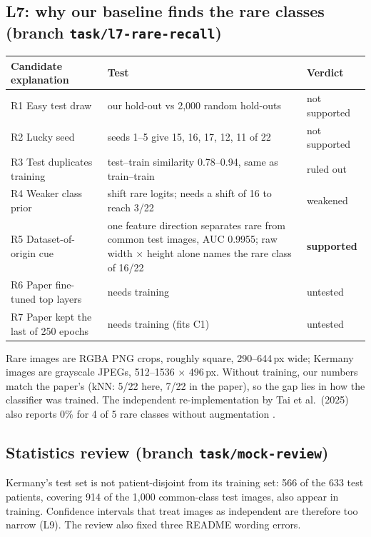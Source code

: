 \documentclass[10pt,a4paper]{article}
\begin{document}
\subsection{L7: why our baseline finds the rare classes (branch \texttt{task/l7-rare-recall})}

\noindent
\begin{tabularx}{\linewidth}{@{}l Y l@{}}
\toprule
Candidate explanation & Test & Verdict \\
\midrule
R1 Easy test draw & our hold-out vs 2,000 random hold-outs & not supported \\
R2 Lucky seed & seeds 1--5 give 15, 16, 17, 12, 11 of 22 & not supported \\
R3 Test duplicates training & test--train similarity 0.78--0.94, same as train--train & ruled out \\
R4 Weaker class prior & shift rare logits; needs a shift of 16 to reach 3/22 & weakened \\
R5 Dataset-of-origin cue & one feature direction separates rare from common test images,
   AUC 0.9955; raw width $\times$ height alone names the rare class of 16/22 & \textcolor{warn}{\textbf{supported}} \\
R6 Paper fine-tuned top layers & needs training & untested \\
R7 Paper kept the last of 250 epochs & needs training (fits C1) & untested \\
\bottomrule
\end{tabularx}

\medskip
\noindent
Rare images are RGBA PNG crops, roughly square, 290--644\,px wide; Kermany images are
grayscale JPEGs, 512--1536 $\times$ 496\,px. Without training, our numbers match the paper's
(kNN: 5/22 here, 7/22 in the paper), so the gap lies in how the classifier was trained.
The independent re-implementation by Tai et al.\ (2025) also reports 0\% for 4 of 5 rare
classes without augmentation \cite{tai2025}.

\subsection{Statistics review (branch \texttt{task/mock-review})}
Kermany's test set is not patient-disjoint from its training set: 566 of the 633 test
patients, covering 914 of the 1,000 common-class test images, also appear in training.
Confidence intervals that treat images as independent are therefore too narrow (L9).
The review also fixed three README wording errors.
\end{document}
